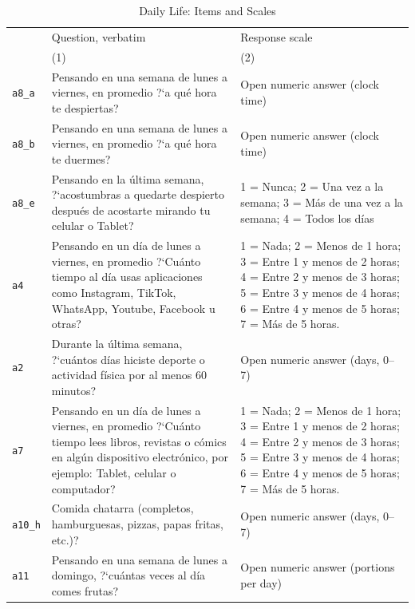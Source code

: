 \begin{table}[htbp]\centering
\caption{Daily Life: Items and Scales}
\label{tab:a_daily}
\footnotesize\renewcommand{\arraystretch}{1.0}
\begin{threeparttable}
\begin{tabular}{@{}p{68pt}p{212pt}p{150pt}@{}}
\toprule
 & Question, verbatim & Response scale \\
 & (1) & (2) \\
\midrule
\texttt{a8\_a} & Pensando en una semana de lunes a viernes, en promedio ?`a qué hora te despiertas? & Open numeric answer (clock time) \\
\addlinespace[1pt]
\texttt{a8\_b} & Pensando en una semana de lunes a viernes, en promedio ?`a qué hora te duermes? & Open numeric answer (clock time) \\
\addlinespace[1pt]
\texttt{a8\_e} & Pensando en la última semana, ?`acostumbras a quedarte despierto después de acostarte mirando tu celular o Tablet? & 1 = Nunca; 2 = Una vez a la semana; 3 = Más de una vez a la semana; 4 = Todos los días \\
\addlinespace[1pt]
\texttt{a4} & Pensando en un día de lunes a viernes, en promedio ?`Cuánto tiempo al día usas aplicaciones como Instagram, TikTok, WhatsApp, Youtube, Facebook u otras? & 1 = Nada; 2 = Menos de 1 hora; 3 = Entre 1 y menos de 2 horas; 4 = Entre 2 y menos de 3 horas; 5 = Entre 3 y menos de 4 horas; 6 = Entre 4 y menos de 5 horas; 7 = Más de 5 horas. \\
\addlinespace[1pt]
\texttt{a2} & Durante la última semana, ?`cuántos días hiciste deporte o actividad física por al menos 60 minutos? & Open numeric answer (days, 0--7) \\
\addlinespace[1pt]
\texttt{a7} & Pensando en un día de lunes a viernes, en promedio ?`Cuánto tiempo lees libros, revistas o cómics en algún dispositivo electrónico, por ejemplo: Tablet, celular o computador? & 1 = Nada; 2 = Menos de 1 hora; 3 = Entre 1 y menos de 2 horas; 4 = Entre 2 y menos de 3 horas; 5 = Entre 3 y menos de 4 horas; 6 = Entre 4 y menos de 5 horas; 7 = Más de 5 horas. \\
\addlinespace[1pt]
\texttt{a10\_h} & Comida chatarra (completos, hamburguesas, pizzas, papas fritas, etc.)? & Open numeric answer (days, 0--7) \\
\addlinespace[1pt]
\texttt{a11} & Pensando en una semana de lunes a domingo, ?`cuántas veces al día comes frutas? & Open numeric answer (portions per day) \\

\end{tabular}
\end{threeparttable}
\end{table}
